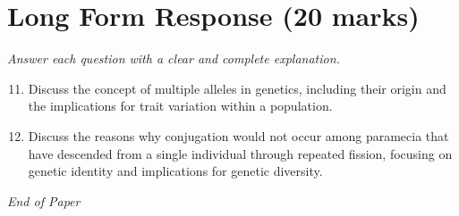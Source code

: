 \documentclass[12pt]{article}
\begin{document}
\section*{Long Form Response (20 marks)}
\textit{Answer each question with a clear and complete explanation.}
\begin{enumerate}[label=\arabic*.]
\setcounter{enumi}{10}
\item Discuss the concept of multiple alleles in genetics, including their origin and the implications for trait variation within a population.
\item Discuss the reasons why conjugation would not occur among paramecia that have descended from a single individual through repeated fission, focusing on genetic identity and implications for genetic diversity.
\end{enumerate}

\vfill
\noindent\textit{End of Paper}
\end{document}
